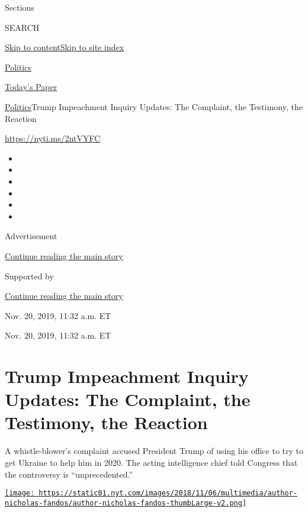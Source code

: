 Sections

SEARCH

\protect\hyperlink{site-content}{Skip to
content}\protect\hyperlink{site-index}{Skip to site index}

\href{https://www.nytimes.com/section/politics}{Politics}

\href{https://myaccount.nytimes.com/auth/login?response_type=cookie\&client_id=vi}{}

\href{https://www.nytimes.com/section/todayspaper}{Today's Paper}

\href{/section/politics}{Politics}\textbar{}Trump Impeachment Inquiry
Updates: The Complaint, the Testimony, the Reaction

\url{https://nyti.ms/2ntVYFC}

\begin{itemize}
\item
\item
\item
\item
\item
\item
\end{itemize}

Advertisement

\protect\hyperlink{after-top}{Continue reading the main story}

Supported by

\protect\hyperlink{after-sponsor}{Continue reading the main story}

Nov. 20, 2019, 11:32 a.m. ET

Nov. 20, 2019, 11:32 a.m. ET

\hypertarget{trump-impeachment-inquiry-updates-the-complaint-the-testimony-the-reaction}{%
\section{Trump Impeachment Inquiry Updates: The Complaint, the
Testimony, the
Reaction}\label{trump-impeachment-inquiry-updates-the-complaint-the-testimony-the-reaction}}

A whistle-blower's complaint accused President Trump of using his office
to try to get Ukraine to help him in 2020. The acting intelligence chief
told Congress that the controversy is ``unprecedented.''

\href{https://www.nytimes.com/by/nicholas-fandos}{\texttt{[image: https://static01.nyt.com/images/2018/11/06/multimedia/author-nicholas-fandos/author-nicholas-fandos-thumbLarge-v2.png]}}

